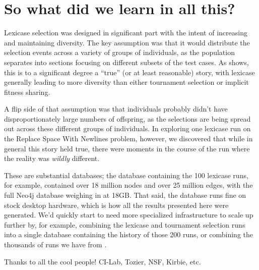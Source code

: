 \section{So what did we learn in all this?}
\label{sec:whatDidWeLearn}




Lexicase selection \citep{Helmuth:2015:ieeeTEC} was designed in significant part with the intent of 
increasing and maintaining diversity. The key assumption was that it would distribute the selection 
events across a variety of groups of individuals, as the population separates into sections focusing
on different subsets of the test cases. As \citep{helmuth:GPTP15} shows, this is to a significant
degree a ``true'' (or at least reasonable) story, with lexicase generally leading to more diversity
than either tournament selection or implicit fitness sharing.

A flip side of that assumption was that individuals probably didn't have disproportionately 
large numbers of offspring, as the selections are being spread out across these different groups
of individuals. In exploring one lexicase run on the Replace Space With Newlines problem, however,
we discovered that while in general this story held true, there were moments in the course of the run
where the reality was \emph{wildly} different.

These are substantial
databases; the database containing the 100 lexicase runs, for example, contained over 18 million nodes and over 25
million edges, with the full Neo4j database weighing in at 18GB. That said, the database runs fine on stock desktop 
hardware, which is how all the results presented here were generated. We'd quickly start to need more specialized
infrastructure to scale up further by, for example, combining the 
lexicase and tournament selection runs into a single database containing the history of those 200 runs, or combining
the thousands of runs we have from \citep{Helmuth:2015:GPTP}.

\begin{acknowledgement}
	Thanks to all the cool people! CI-Lab, Tozier, NSF, Kirbie, etc.
\end{acknowledgement}



